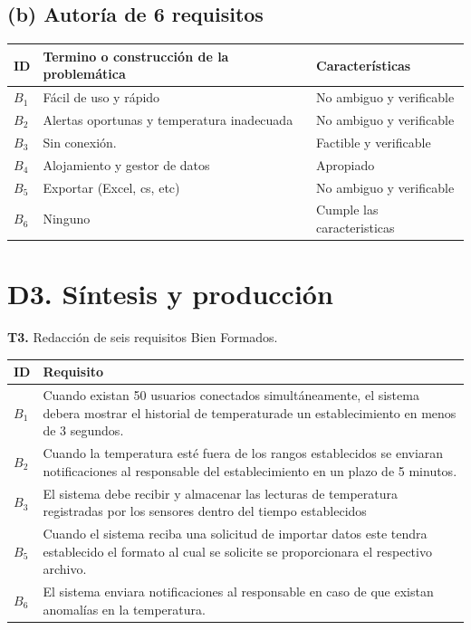\documentclass{article}
\begin{document}
\subsection*{(b) Autoría de 6 requisitos}
\begin{center}
\begin{tabular}{|p{1cm}|p{6cm}|p{4cm}|}
\hline
\textbf{ID} & \textbf{Termino o construcción de la problemática}&\textbf{Características} \\ \hline
$B_1$ & Fácil de uso y rápido  & No ambiguo y verificable \\ \hline
$B_2$ & Alertas oportunas y temperatura inadecuada  & No ambiguo y verificable  \\ \hline
$B_3$ & Sin conexión.  & Factible y verificable \\ \hline
$B_4$ & Alojamiento y gestor de datos  & Apropiado \\ \hline
$B_5$ & Exportar (Excel, cs, etc)  & No ambiguo y verificable \\ \hline
$B_6$ & Ninguno  & Cumple las caracteristicas \\ \hline
\end{tabular}
\end{center}

\section*{D3. Síntesis y producción}
\textbf{T3.} Redacción de seis requisitos Bien Formados.
\begin{center}
\begin{tabular}{|p{1cm}|p{10cm}|}
\hline
\textbf{ID} & \textbf{Requisito} \\ \hline
$B_1$ & Cuando existan 50 usuarios conectados simultáneamente, el sistema debera mostrar el historial de temperaturade un establecimiento en menos de 3 segundos. \\ \hline
$B_2$ & Cuando la temperatura esté fuera de los rangos establecidos se enviaran notificaciones al responsable del establecimiento en un plazo de 5 minutos. \\ \hline
$B_3$ & El sistema debe recibir y almacenar las lecturas de temperatura registradas por los sensores dentro del tiempo establecidos \\ \hline
$B_5$ & Cuando el sistema reciba una solicitud de importar datos este tendra establecido el formato al cual se solicite se proporcionara el respectivo archivo. \\ \hline
$B_6$ & El sistema enviara notificaciones al responsable en caso de que existan anomalías en la temperatura. \\ \hline
\end{tabular}
\end{center}
\end{document}
